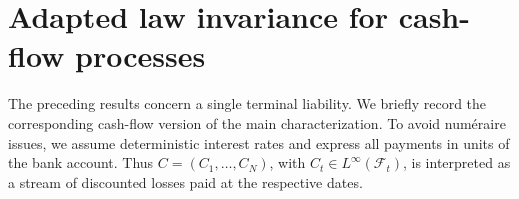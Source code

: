\documentclass[a4paper]{amsart}
\theoremstyle{definition}
\newtheorem{remark}[remark]{Remark}
\newcommand{\F}{\mathcal{F}}
\begin{document}











\section{Adapted law invariance for cash-flow processes}
\label{sec:cash-flow-processes}

The preceding results concern a single terminal liability. We briefly record
the corresponding cash-flow version of the main characterization. To avoid
num\'eraire issues, we assume deterministic interest rates and express all
payments in units of the bank account. Thus
\(C=(C_1,\dots,C_N)\), with \(C_t\in L^\infty(\F_t)\), is interpreted as a
stream of discounted losses paid at the respective dates.
\end{document}
